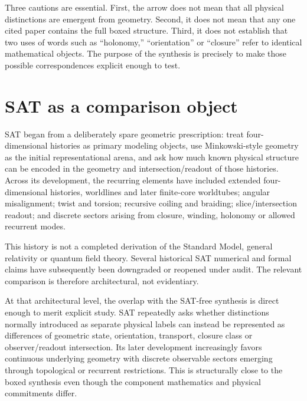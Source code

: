 \documentclass[11pt]{article}
\begin{document}
Three cautions are essential. First, the arrow does not mean that all physical distinctions are emergent from geometry. Second, it does not mean that any one cited paper contains the full boxed structure. Third, it does not establish that two uses of words such as ``holonomy,'' ``orientation'' or ``closure'' refer to identical mathematical objects. The purpose of the synthesis is precisely to make those possible correspondences explicit enough to test.

\section{SAT as a comparison object}
SAT began from a deliberately spare geometric prescription: treat four-dimensional histories as primary modeling objects, use Minkowski-style geometry as the initial representational arena, and ask how much known physical structure can be encoded in the geometry and intersection/readout of those histories. Across its development, the recurring elements have included extended four-dimensional histories, worldlines and later finite-core worldtubes; angular misalignment; twist and torsion; recursive coiling and braiding; slice/intersection readout; and discrete sectors arising from closure, winding, holonomy or allowed recurrent modes.

This history is not a completed derivation of the Standard Model, general relativity or quantum field theory. Several historical SAT numerical and formal claims have subsequently been downgraded or reopened under audit. The relevant comparison is therefore architectural, not evidentiary.

At that architectural level, the overlap with the SAT-free synthesis is direct enough to merit explicit study. SAT repeatedly asks whether distinctions normally introduced as separate physical labels can instead be represented as differences of geometric state, orientation, transport, closure class or observer/readout intersection. Its later development increasingly favors continuous underlying geometry with discrete observable sectors emerging through topological or recurrent restrictions. This is structurally close to the boxed synthesis even though the component mathematics and physical commitments differ.
\end{document}
